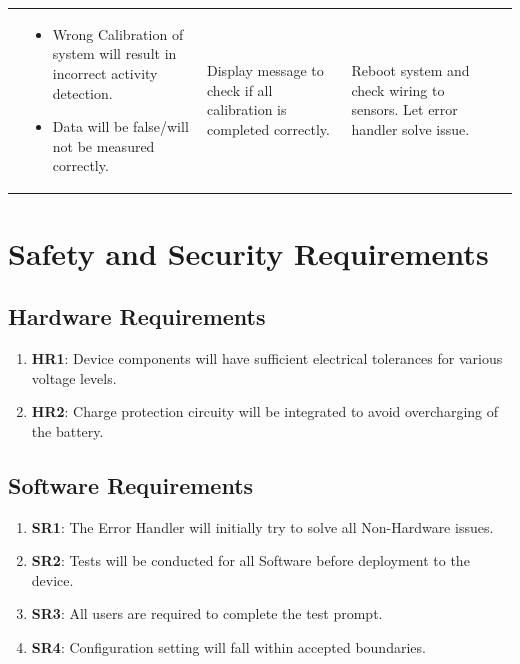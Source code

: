 \documentclass{article}
\begin{document}
\begin{table}[H]
\begin{tabular}{|p{3em}|p{5em}|p{7em}|p{8em}|p{6em}|p{7em}|}
		 & \begin{itemize}[nosep, wide=0pt, leftmargin=*, after=\strut]
			   \item Wrong Calibration of system will result in incorrect activity detection.
			   \item Data will be false/will not be measured correctly.
		   \end{itemize}

		 & Display message to check if all calibration is completed correctly.
		 & Reboot system and check wiring to sensors. Let error handler solve issue. \tabularnewline\cline{1-6}

	\end{tabular}%

	\end{table}

\pagebreak

\section{Safety and Security Requirements}

\subsection{Hardware Requirements}
\begin{enumerate}

	\item\label{HR1}\textbf{HR1}: Device components will have sufficient electrical tolerances for various voltage levels.\\
	\item\label{HR2}\textbf{HR2}: Charge protection circuity will be integrated to avoid overcharging of the battery.\\

\end{enumerate}

\subsection{Software  Requirements}
\begin{enumerate}
	\item\label{SR1}\textbf{SR1}: The Error Handler will initially try to solve all Non-Hardware issues.\\
	\item\label{SR2}\textbf{SR2}: Tests will be conducted for all Software before deployment to the device.\\
	\item\label{SR3}\textbf{SR3}: All users are required to complete the test prompt.\\
	\item\label{SR4}\textbf{SR4}: Configuration setting will fall within accepted boundaries.\\
\end{enumerate}
\end{document}

